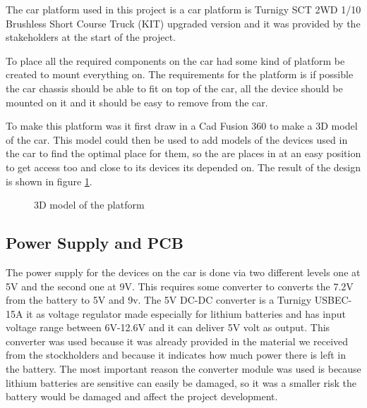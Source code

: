 \documentclass[11pt, titlepage]{article} %
\begin{document}
The car platform used in this project is a car platform is Turnigy SCT 2WD 1/10 Brushless Short Course Truck (KIT) upgraded version and it was provided by the stakeholders at the start of the project. 

To place all the required components on the car had some kind of platform be created to mount everything on. The requirements for the platform is if possible the car chassis should be able to fit on top of the car, all the device should be mounted on it and it should be easy to remove from the car. 

To make this platform was it first draw in a Cad Fusion 360 to make a 3D model of the car. This model could then be used to add models of the devices used in the car to find the optimal place for them, so the are places in at an easy position to get access too and close to its devices its depended on. The result of the design is shown in figure \ref{fig:3d_platform}. 

\begin{figure}
	\caption{3D model of the platform}
	\label{fig:3d_platform}
\end{figure}

\subsection{Power Supply and PCB}

The power supply for the devices on the car is done via two different levels one at 5V and the second one at 9V. This requires some converter to converts the 7.2V from the battery to 5V and 9v. The 5V DC-DC converter is a Turnigy USBEC-15A it as voltage regulator made especially for lithium batteries and has input voltage range between 6V-12.6V and it can deliver 5V volt as output. This converter was used because it was already provided in the material we received from the stockholders and because it indicates how much power there is left in the battery. The most important reason the converter module was used is because lithium batteries are sensitive can easily be damaged, so it was a smaller risk the battery would be damaged and affect the project development. 
\end{document}
